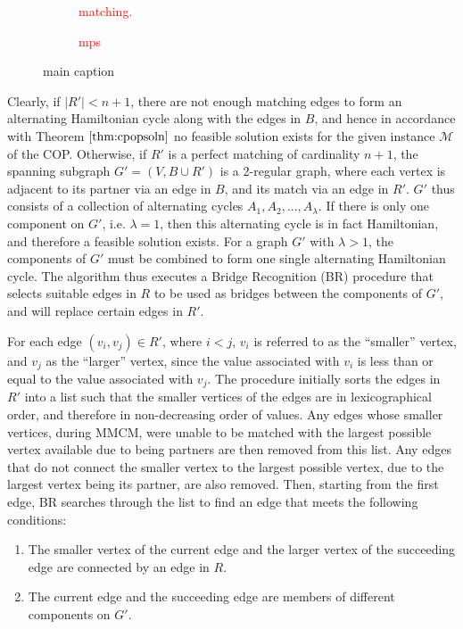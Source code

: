 \documentclass[oribibl]{llncs}
\begin{document}
\begin{figure}	
	\centering
	\begin{subfigure}[h]{0.4\textwidth}
		
		\caption{\textcolor{red}{matching.}}	
		\label{fig:matching}
	\end{subfigure} \quad
	\begin{subfigure}[h]{0.5\textwidth}
		
		\caption{\textcolor{red}{mps}}	
		\label{fig:mps}
	\end{subfigure}
	\caption{main caption}
\end{figure}

Clearly, if $|R'| < n+1$, there are not enough matching edges to form an alternating Hamiltonian cycle along with the edges in $B$, and hence in accordance with Theorem $\ref{thm:cpopsoln}$ no feasible solution exists for the given instance $\mathcal{M}$ of the COP. Otherwise, if $R'$ is a perfect matching of cardinality $n+1$, the spanning subgraph $G'=(V, B \cup R')$ is a 2-regular graph, where each vertex is adjacent to its partner via an edge in $B$, and its match via an edge in $R'$. $G'$ thus consists of a collection of alternating cycles $A_1, A_2, ..., A_{\lambda}$. If there is only one component on $G'$, i.e. $\lambda = 1$, then this alternating cycle is in fact Hamiltonian, and therefore a feasible solution exists. For a graph $G'$ with $\lambda > 1$, the components of $G'$ must be combined to form one single alternating Hamiltonian cycle. The algorithm thus executes a Bridge Recognition (BR) procedure that selects suitable edges in $R$ to be used as bridges between the components of $G'$, and will replace certain edges in $R'$.

For each edge $(v_i, v_j) \in R'$, where $i < j$, $v_i$ is referred to as the ``smaller'' vertex, and $v_j$ as the ``larger'' vertex, since the value associated with $v_i$ is less than or equal to the value associated with $v_j$. The procedure initially sorts the edges in $R'$ into a list such that the smaller vertices of the edges are in lexicographical order, and therefore in non-decreasing order of values. Any edges whose smaller vertices, during MMCM, were unable to be matched with the largest possible vertex available due to being partners are then removed from this list. Any edges that do not connect the smaller vertex to the largest possible vertex, due to the largest vertex being its partner, are also removed. Then, starting from the first edge, BR searches through the list to find an edge that meets the following conditions:
\begin{enumerate}
	\item The smaller vertex of the current edge and the larger vertex of the succeeding edge are connected by an edge in $R$.
	\item The current edge and the succeeding edge are members of different components on $G'$.
\end{enumerate}
\end{document}
